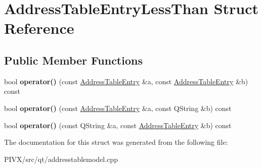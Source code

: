 \hypertarget{struct_address_table_entry_less_than}{}\section{Address\+Table\+Entry\+Less\+Than Struct Reference}
\label{struct_address_table_entry_less_than}
\subsection*{Public Member Functions}
\begin{DoxyCompactItemize}
\item 
\mbox{\label{struct_address_table_entry_less_than_a0fdbbdb81908a5353470b0ad33497df8}} 
bool {\bfseries operator()} (const \mbox{\hyperlink{struct_address_table_entry}{Address\+Table\+Entry}} \&a, const \mbox{\hyperlink{struct_address_table_entry}{Address\+Table\+Entry}} \&b) const
\item 
\mbox{\label{struct_address_table_entry_less_than_ac29af39cd6bf6448464d2c2259c65a48}} 
bool {\bfseries operator()} (const \mbox{\hyperlink{struct_address_table_entry}{Address\+Table\+Entry}} \&a, const Q\+String \&b) const
\item 
\mbox{\label{struct_address_table_entry_less_than_a9762e0ef749fcdcfeda3f741eb4f71b8}} 
bool {\bfseries operator()} (const Q\+String \&a, const \mbox{\hyperlink{struct_address_table_entry}{Address\+Table\+Entry}} \&b) const
\end{DoxyCompactItemize}


The documentation for this struct was generated from the following file\+:\begin{DoxyCompactItemize}
\item 
P\+I\+V\+X/src/qt/addresstablemodel.\+cpp\end{DoxyCompactItemize}
